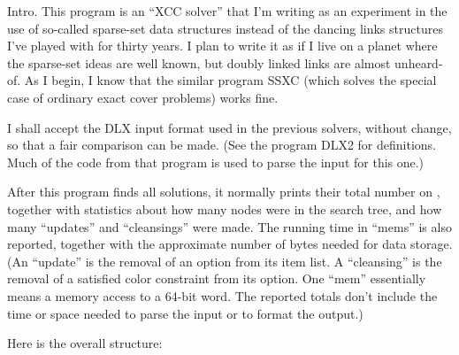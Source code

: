
\let\Xmod=\bmod %

\datethis

Intro. This program is an ``{\mc XCC} solver'' that I'm writing
as an experiment in the use of so-called sparse-set data structures
instead of the dancing links structures I've played with for thirty years.
I plan to write it as if I live on a planet where the sparse-set
ideas are well known, but doubly linked links are almost unheard-of.
As I begin, I know that the similar program {\mc SSXC} (which solves
the special case of ordinary exact cover problems) works fine.

I shall accept the {\mc DLX} input format used in the previous solvers,
without change, so that a fair comparison can be made.
(See the program {\mc DLX2} for definitions. Much of the code from
that program is used to parse the input for this one.)

\fi

After this program finds all solutions, it normally prints their total
number on , together with statistics about how many
nodes were in the search tree, and how many ``updates'' and
``cleansings'' were made.
The running time in ``mems'' is also reported, together with the approximate
number of bytes needed for data storage.
(An ``update'' is the removal of an option from its item list.
A ``cleansing'' is the removal of a satisfied color constraint from its option.
One ``mem'' essentially means a memory access to a 64-bit word.
The reported totals don't include the time or space needed to parse the
input or to format the output.)

Here is the overall structure:

